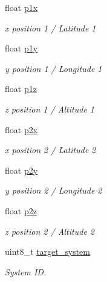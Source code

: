 \begin{DoxyCompactItemize}
\item 
float \hyperlink{struct____mavlink__safety__set__allowed__area__t_acf2cef0f070243c5e89a64f6f2ca413f}{p1x}
\begin{DoxyCompactList}\small\item\em x position 1 / Latitude 1 \end{DoxyCompactList}\item 
float \hyperlink{struct____mavlink__safety__set__allowed__area__t_a9cc53ebb50e264875c81df3671735dbe}{p1y}
\begin{DoxyCompactList}\small\item\em y position 1 / Longitude 1 \end{DoxyCompactList}\item 
float \hyperlink{struct____mavlink__safety__set__allowed__area__t_a290829bbd18c41b9d559d2c35850b919}{p1z}
\begin{DoxyCompactList}\small\item\em z position 1 / Altitude 1 \end{DoxyCompactList}\item 
float \hyperlink{struct____mavlink__safety__set__allowed__area__t_aca63129651b0cc2d7394216782d9f721}{p2x}
\begin{DoxyCompactList}\small\item\em x position 2 / Latitude 2 \end{DoxyCompactList}\item 
float \hyperlink{struct____mavlink__safety__set__allowed__area__t_a6cab84234ced01ba0108e81a0147df09}{p2y}
\begin{DoxyCompactList}\small\item\em y position 2 / Longitude 2 \end{DoxyCompactList}\item 
float \hyperlink{struct____mavlink__safety__set__allowed__area__t_a9609ca1370ee08e0acfb658d37bfa6d1}{p2z}
\begin{DoxyCompactList}\small\item\em z position 2 / Altitude 2 \end{DoxyCompactList}\item 
uint8\+\_\+t \hyperlink{struct____mavlink__safety__set__allowed__area__t_acd133dd7eb95a5846b4354acdb74bef1}{target\+\_\+system}
\begin{DoxyCompactList}\small\item\em System I\+D. \end{DoxyCompactList}\item 

\end{DoxyCompactItemize}
